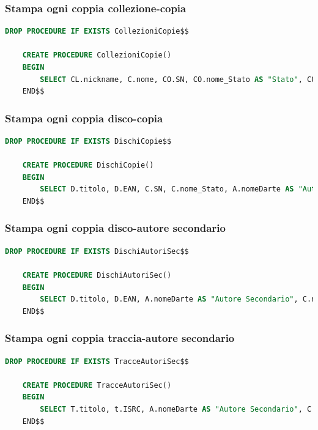 \documentclass{article}
\begin{document}
\subsubsection{Stampa ogni coppia collezione-copia}
\begin{lstlisting}[language=SQL]
    DROP PROCEDURE IF EXISTS CollezioniCopie$$

    CREATE PROCEDURE CollezioniCopie()
    BEGIN
        SELECT CL.nickname, C.nome, CO.SN, CO.nome_Stato AS "Stato", CO.doppioni, C.isPubblica AS Pubblica, D.titolo, D.EAN, A.nomeDarte AS "Autore principale" FROM Autore A, Collezionista CL, Collezione C, Copia CO, Disco D WHERE C.id = CO.id_collezione AND CO.id_disco = D.id AND C.id_collezionista = CL.id AND A.id = D.id_autore ORDER BY C.nome;
    END$$    
\end{lstlisting}

\subsubsection{Stampa ogni coppia disco-copia}
\begin{lstlisting}[language=SQL]
    DROP PROCEDURE IF EXISTS DischiCopie$$

    CREATE PROCEDURE DischiCopie()
    BEGIN
        SELECT D.titolo, D.EAN, C.SN, C.nome_Stato, A.nomeDarte AS "Autore principale" FROM Disco D, Copia C, Autore A WHERE C.id_disco = D.id AND A.id = D.id_autore;
    END$$
\end{lstlisting}

\subsubsection{Stampa ogni coppia disco-autore secondario}
\begin{lstlisting}[language=SQL]
    DROP PROCEDURE IF EXISTS DischiAutoriSec$$

    CREATE PROCEDURE DischiAutoriSec()
    BEGIN
        SELECT D.titolo, D.EAN, A.nomeDarte AS "Autore Secondario", C.nome_tipo AS "Tipo" FROM Disco D, Autore A, Collabora C WHERE D.id = C.id_disco AND C.id_autore = A.id;
    END$$
\end{lstlisting}

\subsubsection{Stampa ogni coppia traccia-autore secondario}
\begin{lstlisting}[language=SQL]
    DROP PROCEDURE IF EXISTS TracceAutoriSec$$

    CREATE PROCEDURE TracceAutoriSec()
    BEGIN
        SELECT T.titolo, t.ISRC, A.nomeDarte AS "Autore Secondario", C.nome_tipo AS "Tipo" FROM Traccia T, Autore A, Contribuisce C WHERE T.id = C.id_traccia AND C.id_autore = A.id;
    END$$
\end{lstlisting}
\end{document}
